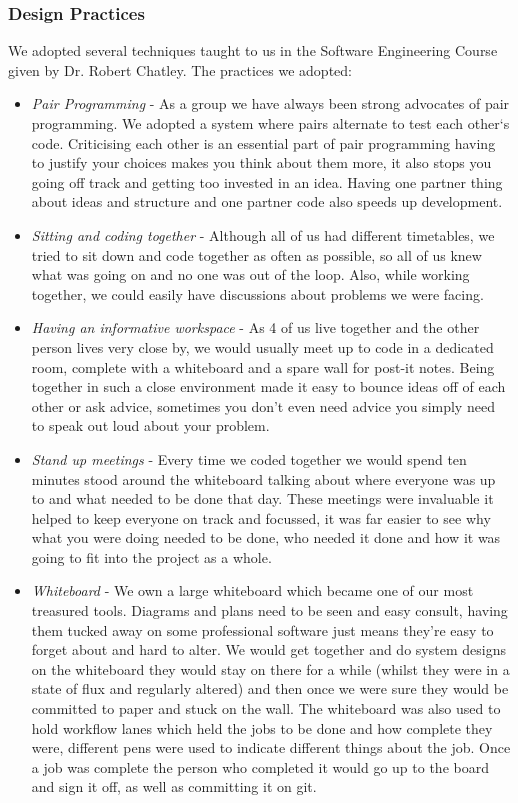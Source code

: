 \documentclass[11pt]{article}
\begin{document}
\subsubsection{Design Practices}
We adopted several techniques taught to us in the Software Engineering Course
given by Dr. Robert Chatley.
The practices we adopted:
\begin{itemize}
\item 
\emph{Pair Programming} - As a group we have always been strong advocates of pair
		 programming. We adopted a system where pairs alternate to test each other`s code. 			 Criticising each other is an essential part of pair programming
		 having to justify your choices makes you think about them more, it also 
		 stops you going off track and getting too invested in an idea. Having
		 one partner thing about ideas and structure and one partner code also speeds
		 up development.
		 
\item 
\emph{Sitting and coding together} - Although all of us had different timetables,
			we tried to sit down and code together as often as possible, so all
			of us knew what was going on and no one was out of the loop. Also, while
			working together, we could easily have discussions about problems we
			were facing.
\item 
\emph{Having an informative workspace} - As 4 of us live together and the other
			person lives very close by, we would usually meet up to code in a 
			dedicated room, complete with a whiteboard and a spare wall for post-it
			notes. Being together in such a close environment made it easy to bounce
			ideas off of each other or ask advice, sometimes you don't even need advice
			you simply need to speak out loud about your problem.

\item 
\emph{Stand up meetings} - Every time we coded together we would spend ten minutes
			stood around the whiteboard talking about where everyone was up to and what needed to
			be done that day. These meetings were invaluable it helped to keep everyone on track and
			focussed, it was far easier to see why what you were doing needed to be done, who needed it done 
			and how it was going to fit into the project as a whole.

\item
\emph{Whiteboard} - We own a large whiteboard which became one of our most treasured tools. Diagrams and plans 
					need to be seen and easy consult, having them tucked away on some professional software
					just means they're easy to forget about and hard to alter. We would get together and do
					system designs on the whiteboard they would stay on there for a while (whilst they were in a state of
					flux and regularly altered) and then once we were sure they would be committed to paper and stuck on the wall.
					The whiteboard was also used to hold workflow lanes which held the jobs to be done and how complete they were, 
					different pens were used to indicate different things about the job. Once a job was complete the person who
					completed it would go up to the board and sign it off, as well as committing it on git.
					

\end{itemize}
\end{document}
